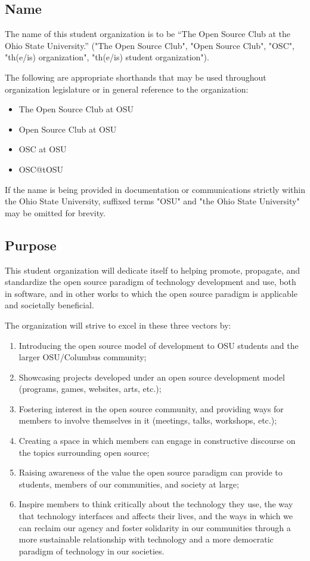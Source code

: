 \documentclass[12pt,letterpaper]{article}
\begin{document}
\subsection{Name}

The name of this student organization is to be ``The Open Source Club at the Ohio State
University.'' ("The Open Source Club", "Open Source  Club", "OSC", "th(e/is) organization",
"th(e/is) student organization").

The following are appropriate shorthands that may be used throughout organization legislature
or in general reference to the organization:

\begin{itemize}
  \item The Open Source Club at OSU
  \item Open Source Club at OSU
  \item OSC at OSU
  \item OSC@tOSU
\end{itemize}

If the name is being provided in documentation or communications strictly within the
Ohio State University, suffixed terms "OSU" and "the Ohio State University" may be omitted
for brevity.

\subsection{Purpose}

This student organization will dedicate itself to helping promote, propagate, and standardize
the open source paradigm of technology development and use, both in software, and in other
works to which the open source paradigm is applicable and societally beneficial.

The organization will strive to excel in these three vectors by:

\begin{enumerate}[label=\textcolor{accent}{\alph*.}, leftmargin=2em]
  \item Introducing the open source model of development to OSU students and the larger
    OSU/Columbus community;
  \item Showcasing projects developed under an open source development model (programs,
    games, websites, arts, etc.);
  \item Fostering interest in the open source community, and providing ways for members
    to involve themselves in it (meetings, talks, workshops, etc.);
  \item Creating a space in which members can engage in constructive discourse on the
    topics surrounding open source;
  \item Raising awareness of the value the open source paradigm can provide to students,
    members of our communities, and society at large;
  \item Inspire members to think critically about the technology they use, the way that
    technology interfaces and affects their lives, and the ways in which we can reclaim
    our agency and foster solidarity in our communities through a more sustainable
    relationship with technology and a more democratic paradigm of technology in our societies.
\end{enumerate}
\end{document}

